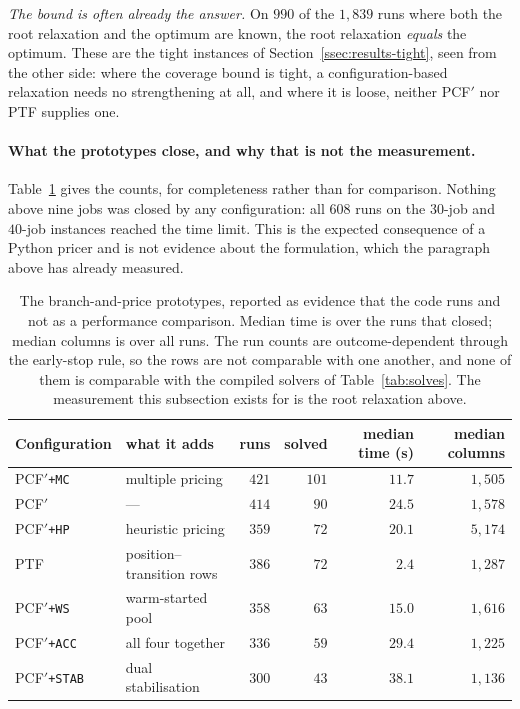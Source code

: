 \emph{The bound is often already the answer.} On $990$ of the $1{,}839$ runs where both
the root relaxation and the optimum are known, the root relaxation \emph{equals} the
optimum. These are the tight instances of Section~\ref{ssec:results-tight}, seen from
the other side: where the coverage bound is tight, a configuration-based relaxation
needs no strengthening at all, and where it is loose, neither PCF$'$ nor PTF supplies
one.

\paragraph{What the prototypes close, and why that is not the measurement.}
Table~\ref{tab:bnp} gives the counts, for completeness rather than for comparison.
Nothing above nine jobs was closed by any configuration: all $608$ runs on the $30$-job
and $40$-job instances reached the time limit. This is the expected consequence of a
Python pricer and is not evidence about the formulation, which the paragraph above has
already measured.

\begin{table}[h]\centering
\footnotesize
\begin{tabular}{@{}llrrrr@{}}
\toprule
Configuration & what it adds & runs & solved & median time (s) & median columns\\
\midrule
PCF$'$\texttt{+MC}   & multiple pricing          & $421$ & $101$ & $11.7$ & $1{,}505$\\
PCF$'$               & ---                       & $414$ & $90$  & $24.5$ & $1{,}578$\\
PCF$'$\texttt{+HP}   & heuristic pricing         & $359$ & $72$  & $20.1$ & $5{,}174$\\
PTF                  & position--transition rows & $386$ & $72$  & $2.4$  & $1{,}287$\\
PCF$'$\texttt{+WS}   & warm-started pool         & $358$ & $63$  & $15.0$ & $1{,}616$\\
PCF$'$\texttt{+ACC}  & all four together         & $336$ & $59$  & $29.4$ & $1{,}225$\\
PCF$'$\texttt{+STAB} & dual stabilisation        & $300$ & $43$  & $38.1$ & $1{,}136$\\
\bottomrule
\end{tabular}
\caption{The branch-and-price prototypes, reported as evidence that the code runs and
not as a performance comparison. Median time is over the runs that closed; median
columns is over all runs. The run counts are outcome-dependent through the early-stop
rule, so the rows are not comparable with one another, and none of them is comparable
with the compiled solvers of Table~\ref{tab:solves}. The measurement this subsection
exists for is the root relaxation above.}
\label{tab:bnp}
\end{table}


